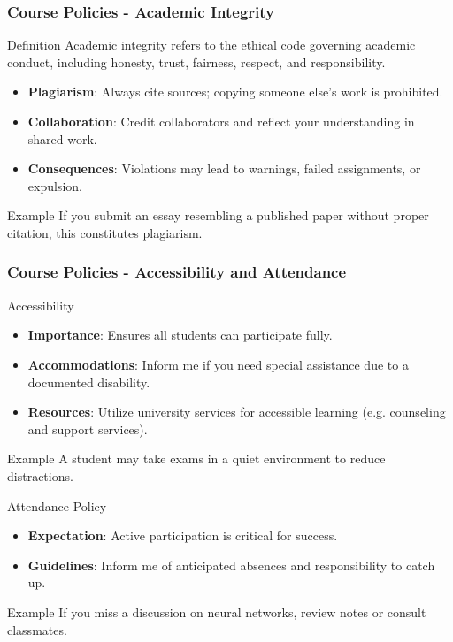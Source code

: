\documentclass[aspectratio=169]{beamer}
\begin{document}
\begin{frame}[fragile]
    \frametitle{Course Policies - Academic Integrity}
    \begin{block}{Definition}
        Academic integrity refers to the ethical code governing academic conduct, including honesty, trust, fairness, respect, and responsibility.
    \end{block}

    \begin{itemize}
        \item \textbf{Plagiarism}: Always cite sources; copying someone else's work is prohibited.
        \item \textbf{Collaboration}: Credit collaborators and reflect your understanding in shared work.
        \item \textbf{Consequences}: Violations may lead to warnings, failed assignments, or expulsion.
    \end{itemize}

    \begin{block}{Example}
        If you submit an essay resembling a published paper without proper citation, this constitutes plagiarism.
    \end{block}
\end{frame}

\begin{frame}[fragile]
    \frametitle{Course Policies - Accessibility and Attendance}
    \begin{section*}{Accessibility}
        \begin{itemize}
            \item \textbf{Importance}: Ensures all students can participate fully.
            \item \textbf{Accommodations}: Inform me if you need special assistance due to a documented disability.
            \item \textbf{Resources}: Utilize university services for accessible learning (e.g. counseling and support services).
        \end{itemize}
        
        \begin{block}{Example}
            A student may take exams in a quiet environment to reduce distractions.
        \end{block}
    \end{section*}
    
    \begin{section*}{Attendance Policy}
        \begin{itemize}
            \item \textbf{Expectation}: Active participation is critical for success.
            \item \textbf{Guidelines}: Inform me of anticipated absences and responsibility to catch up.
        \end{itemize}
        
        \begin{block}{Example}
            If you miss a discussion on neural networks, review notes or consult classmates.
        \end{block}
    \end{section*}
\end{frame}
\end{document}
